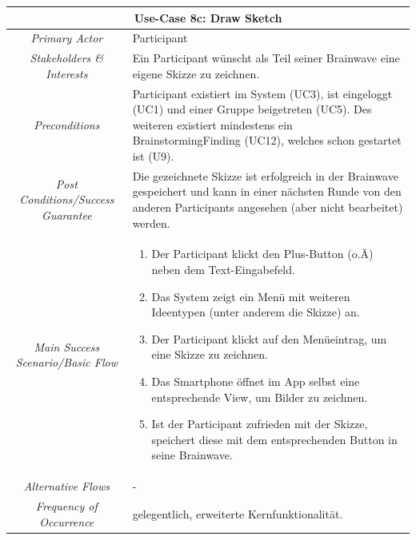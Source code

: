\renewcommand{\arraystretch}{1.35}
\begin{center}
	\begin{longtable}{| c | p{7cm} |}
		\hline
		\multicolumn{2}{|c|}{\textbf{Use-Case 8c: Draw Sketch}}\\
		\hline\hline
		\textit{Primary Actor} & Participant\\
		\hline
		\textit{Stakeholders \& Interests} & Ein Participant wünscht als Teil seiner Brainwave eine eigene Skizze zu zeichnen. \\
		\hline
		\textit{Preconditions} & Participant existiert im System (UC3), ist eingeloggt (UC1) und einer Gruppe beigetreten (UC5). Des weiteren existiert mindestens ein BrainstormingFinding (UC12), welches schon gestartet ist (U9).\\
		\hline
		\textit{Post Conditions/Success Guarantee} & Die gezeichnete Skizze ist erfolgreich in der Brainwave gespeichert und kann in einer nächsten Runde von den anderen Participants angesehen (aber nicht bearbeitet) werden.\\
		\hline
		\textit{Main Success Scenario/Basic Flow} & 
		\begin{enumerate}[noitemsep]
			\item Der Participant klickt den Plus-Button (o.Ä) neben dem Text-Eingabefeld.
			\item Das System zeigt ein Menü mit weiteren Ideentypen (unter anderem die Skizze) an.
			\item Der Participant klickt auf den Menüeintrag, um eine Skizze zu zeichnen.
			\item Das Smartphone öffnet im App selbst eine entsprechende View, um Bilder zu zeichnen.
			\item Ist der Participant zufrieden mit der Skizze, speichert diese mit dem entsprechenden Button in seine Brainwave.
		\end{enumerate}\\
		\hline
		\textit{Alternative Flows} &
		-\\
		\hline
		\textit{Frequency of Occurrence} & gelegentlich, erweiterte Kernfunktionalität.\\
		\hline
	\end{longtable}
\end{center}

